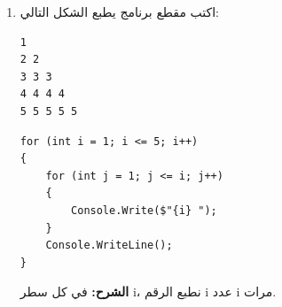 \documentclass[14pt]{extarticle}
\begin{document}
\begin{enumerate}[itemsep=2em]
    \item
    اكتب مقطع برنامج يطبع الشكل التالي:
    \begin{english}
    \begin{boxCode}
\begin{verbatim}
1
2 2
3 3 3
4 4 4 4
5 5 5 5 5
    \end{verbatim}
\end{boxCode}
    \end{english}
    \ifwithsols
    \begin{boxSolution}
    \begin{english}
    \begin{verbatim}
for (int i = 1; i <= 5; i++)
{
    for (int j = 1; j <= i; j++)
    {
        Console.Write($"{i} ");
    }
    Console.WriteLine();
}
    \end{verbatim}
    \end{english}
    \textbf{الشرح:} في كل سطر \textenglish{i}، نطبع الرقم \textenglish{i} عدد \textenglish{i} مرات.
    \end{boxSolution}
    \fi

\end{enumerate}
\end{document}
